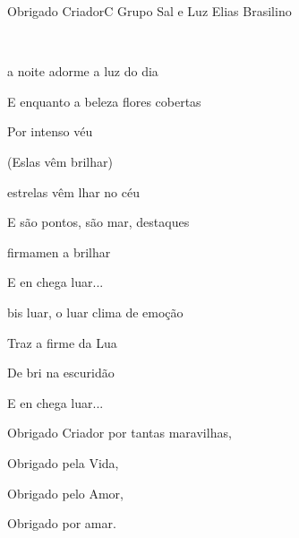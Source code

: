 \documentclass[a4,12pt,oneside]{book}
\newcommand{\RevDate}{\today}
\newcommand{\NotCCLIed}{\relax}
\begin{document}
\begin{song}{Obrigado Criador}{C}
  {Grupo Sal e Luz}
  {Elias Brasilino}
  {}
  {\NotCCLIed}
  
	\renewcommand{\RevDate}{24 de julho de 2014}
 
	
	\ifChordBk
	
	{\vspace{-2em}\flushright{\Cchord \quad \Emchord \quad \Amchord \quad \AmGchord \quad \Fchord \quad \Gchord}\\}
	
	\vspace{-1ex}
	\fi
	
	\begin{SBVerse*}
		 a noite adorme a luz do dia 
		
		E enquanto a beleza  flores  cobertas
		
		Por  intenso véu

		(Eslas vêm brilhar)
	\end{SBVerse*}

	\begin{SBVerse*}
		 estrelas vêm lhar no céu ~\Ch{Am}{~}
		
		E são pontos, são mar, destaques
		
		 firmamen a brilhar~\Ch{C}{~}
		
		E en chega  luar...
	\end{SBVerse*}
	
	\begin{SBChorus}
		\begin{SBBracket}{bis}
			 luar, o luar  clima de emoção ~ 
			
			Traz a firme  da Lua ~ 
			
			De bri na escuridão
			
			E en chega  luar...
		\end{SBBracket}
	\end{SBChorus}
	
	\begin{SBBracket}{}\small
		Obrigado Criador por tantas maravilhas,
		
		Obrigado pela Vida,
		
		Obrigado pelo Amor,
		
		Obrigado por amar.
	\end{SBBracket}
	
\end{song}
\end{document}
